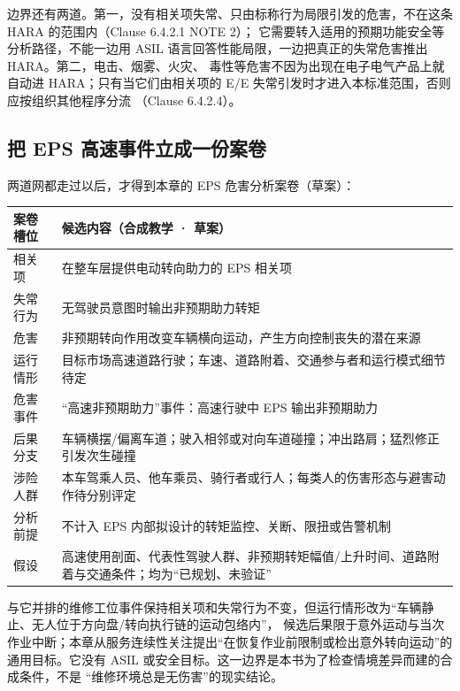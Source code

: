 边界还有两道。第一，没有相关项失常、只由标称行为局限引发的危害，不在这条 HARA 的范围内（Clause 6.4.2.1 NOTE 2）；
它需要转入适用的预期功能安全等分析路径，不能一边用 ASIL 语言回答性能局限，一边把真正的失常危害推出 HARA。第二，电击、烟雾、火灾、
毒性等危害不因为出现在电子电气产品上就自动进 HARA；只有当它们由相关项的 E/E 失常引发时才进入本标准范围，否则应按组织其他程序分流
（Clause 6.4.2.4）。

\subsection{把 EPS 高速事件立成一份案卷}

两道网都走过以后，才得到本章的 EPS 危害分析案卷（草案）：

\begin{center}
\begingroup\small
\setlength{\tabcolsep}{4pt}
\begin{tabularx}{\linewidth}{@{}XX@{}}
\toprule
案卷槽位 & 候选内容（合成教学 · 草案） \\
\midrule
相关项 & 在整车层提供电动转向助力的 EPS 相关项 \\
失常行为 & 无驾驶员意图时输出非预期助力转矩 \\
危害 & 非预期转向作用改变车辆横向运动，产生方向控制丧失的潜在来源 \\
运行情形 & 目标市场高速道路行驶；车速、道路附着、交通参与者和运行模式细节待定 \\
危害事件 & “高速非预期助力”事件：高速行驶中 EPS 输出非预期助力 \\
后果分支 & 车辆横摆/偏离车道；驶入相邻或对向车道碰撞；冲出路肩；猛烈修正引发次生碰撞 \\
涉险人群 & 本车驾乘人员、他车乘员、骑行者或行人；每类人的伤害形态与避害动作待分别评定 \\
分析前提 & 不计入 EPS 内部拟设计的转矩监控、关断、限扭或告警机制 \\
假设 & 高速使用剖面、代表性驾驶人群、非预期转矩幅值/上升时间、道路附着与交通条件；均为“已规划、未验证” \\
\bottomrule
\end{tabularx}
\endgroup
\end{center}

与它并排的维修工位事件保持相关项和失常行为不变，但运行情形改为“车辆静止、无人位于方向盘/转向执行链的运动包络内”，
候选后果限于意外运动与当次作业中断；本章从服务连续性关注提出“在恢复作业前限制或检出意外转向运动”的
通用目标。它没有 ASIL 或安全目标。这一边界是本书为了检查情境差异而建的合成条件，不是
“维修环境总是无伤害”的现实结论。

